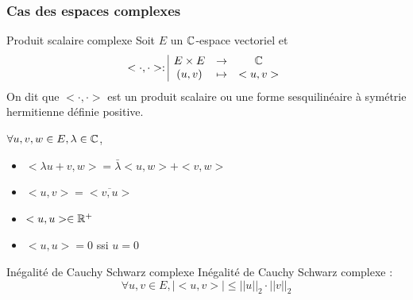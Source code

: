 \subsubsection{Cas des espaces complexes }

\begin{definition}{Produit scalaire complexe}{}
    Soit $E$ un $\mathbb{C}$-espace vectoriel et 
    $$<\cdot, \cdot>: \space \begin{array}{|ccc} \displaystyle E \times E & \to & \displaystyle \mathbb{C} \\ \displaystyle (u, v) & \mapsto & \displaystyle <u, v> \end{array}$$
    On dit que $<\cdot, \cdot>$ est un produit scalaire ou une forme 
    sesquilinéaire à symétrie hermitienne définie positive. 

    $\forall u, v, w \in E, \lambda \in \mathbb{C}$, 

    \begin{itemize}
        \item $<\lambda u + v, w> = \bar \lambda<u, w> + <v, w>$
        \item $<u, v> = \overline{<v, u>}$
        \item $<u, u> \in \mathbb{R}^+$
        \item $<u, u> = 0$ ssi $u=0$
    \end{itemize}
\end{definition}

\begin{theoreme}{Inégalité de Cauchy Schwarz complexe}{}
    Inégalité de Cauchy Schwarz complexe :
    $$\forall u, v \in E, \mid <u, v> \mid \leqslant ||u||_2 \cdot ||v||_2$$
\end{theoreme}


